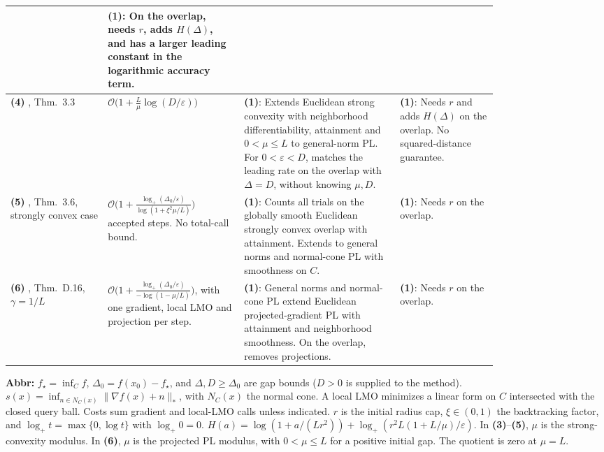 \begin{table}[tp]
\begin{threeparttable}
\begin{tabularx}{\linewidth}{@{}>{\raggedright\arraybackslash}p{0.20\linewidth}>{\raggedright\arraybackslash}p{0.29\linewidth}>{\raggedright\arraybackslash}p{0.32\linewidth}>{\raggedright\arraybackslash}X@{}}
& \textbf{(1)}: On the overlap, needs $r$, adds $H(\Delta)$, and has a larger leading constant in the logarithmic accuracy term. \\
\midrule
\textbf{(4)} \citep{kvBrox2026v2}, Thm.~3.3
& $\mathcal{O}\bigl(1+\frac L\mu\log(D/\varepsilon)\bigr)$
& \textbf{(1)}: Extends Euclidean strong convexity with neighborhood differentiability, attainment and $0<\mu\le L$ to general-norm PL. For $0<\varepsilon<D$, matches the leading rate on the overlap with $\Delta=D$, without knowing $\mu,D$.
& \textbf{(1)}: Needs $r$ and adds $H(\Delta)$ on the overlap. No squared-distance guarantee. \\
\midrule
\textbf{(5)} \citep{kvBrox2026v2}, Thm.~3.6, strongly convex case
& $\mathcal{O}\bigl(1+\frac{\log_+(\Delta_0/\varepsilon)}{\log(1+\xi^2\mu/L)}\bigr)$ accepted steps. No total-call bound.
& \textbf{(1)}: Counts all trials on the globally smooth Euclidean strongly convex overlap with attainment. Extends to general norms and normal-cone PL with smoothness on $C$.
& \textbf{(1)}: Needs $r$ on the overlap. \\
\midrule
\textbf{(6)} \citep{kvBrox2026v2}, Thm.~D.16, $\gamma=1/L$
& $\mathcal{O}\bigl(1+\frac{\log_+(\Delta_0/\varepsilon)}{-\log(1-\mu/L)}\bigr)$, with one gradient, local LMO and projection per step.
& \textbf{(1)}: General norms and normal-cone PL extend Euclidean projected-gradient PL with attainment and neighborhood smoothness. On the overlap, removes projections.
& \textbf{(1)}: Needs $r$ on the overlap. \\
\bottomrule
\end{tabularx}
\begin{tablenotes}[flushleft]\footnotesize
\item[] \textbf{Abbr:} $f_\star=\inf_C f$, $\Delta_0=f(x_0)-f_\star$, and $\Delta,D\ge\Delta_0$ are gap bounds ($D>0$ is supplied to the method). $s(x)=\inf_{n\in N_C(x)}\|\nabla f(x)+n\|_*$, with $N_C(x)$ the normal cone. A local LMO minimizes a linear form on $C$ intersected with the closed query ball. Costs sum gradient and local-LMO calls unless indicated. $r$ is the initial radius cap, $\xi\in(0,1)$ the backtracking factor, and $\log_+ t=\max\{0,\log t\}$ with $\log_+0=0$. $H(a)=\log(1+a/(Lr^2))+\log_+(r^2L(1+L/\mu)/\varepsilon)$. In \textbf{(3)}--\textbf{(5)}, $\mu$ is the strong-convexity modulus. In \textbf{(6)}, $\mu$ is the projected PL modulus, with $0<\mu\le L$ for a positive initial gap. The quotient is zero at $\mu=L$.
\end{tablenotes}
\end{threeparttable}
\end{table}
